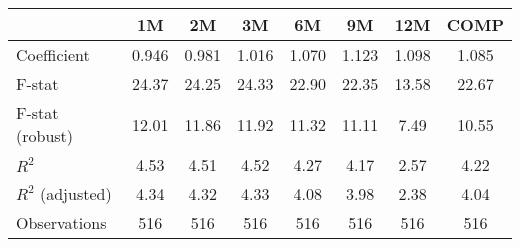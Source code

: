 \begin{tabular}{lccccccc}\toprule\midrule  
 & 1M & 2M & 3M & 6M & 9M & 12M & COMP   \\ \midrule  
 Coefficient &    0.946 &    0.981 &    1.016 &    1.070 &    1.123 &    1.098 &    1.085   \\ 
 F-stat &    24.37 &    24.25 &    24.33 &    22.90 &    22.35 &    13.58 &    22.67   \\ 
 F-stat (robust)&    12.01 &    11.86 &    11.92 &    11.32 &    11.11 &     7.49 &    10.55   \\ 
 $R^2$ &     4.53 &     4.51 &     4.52 &     4.27 &     4.17 &     2.57 &     4.22   \\ 
 $R^2$ (adjusted) &     4.34 &     4.32 &     4.33 &     4.08 &     3.98 &     2.38 &     4.04   \\ 
 Observations &      516 &      516 &      516 &      516 &      516 &      516 &      516   \\ 
\midrule\bottomrule 
\end{tabular}
